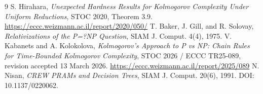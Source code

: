 \documentclass[11pt]{article}
\begin{document}
\begin{thebibliography}{9}
 S. Hirahara, \emph{Unexpected Hardness Results for
Kolmogorov Complexity Under Uniform Reductions}, STOC 2020, Theorem 3.9.
\url{https://eccc.weizmann.ac.il/report/2020/050/}
 T. Baker, J. Gill, and R. Solovay,
\emph{Relativizations of the P=?NP Question}, SIAM J. Comput. 4(4), 1975.
 V. Kabanets and A. Kolokolova, \emph{Kolmogorov's
Approach to P vs NP: Chain Rules for Time-Bounded Kolmogorov Complexity},
STOC 2026 / ECCC TR25-089, revision accepted 13 March 2026.
\url{https://eccc.weizmann.ac.il/report/2025/089}
 N. Nisan, \emph{CREW PRAMs and Decision Trees},
SIAM J. Comput. 20(6), 1991. DOI: 10.1137/0220062.
\end{thebibliography}
\end{document}
